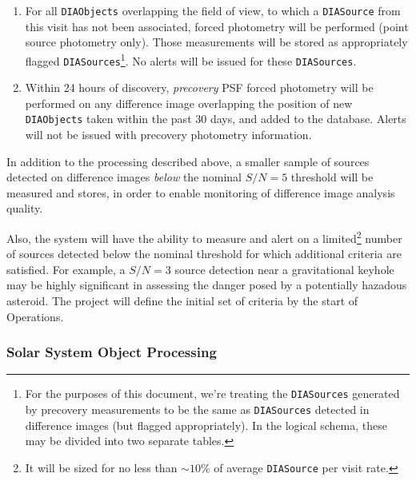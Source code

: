 \documentclass[12pt]{article}
\newcommand{\code}[1]{\texttt{#1}}
\newcommand{\DIASource}{\code{DIASource}\xspace}
\newcommand{\DIASources}{\code{DIASources}\xspace}
\newcommand{\DIAObjects}{\code{DIAObjects}\xspace}
\begin{document}
\begin{enumerate}
\item For all \DIAObjects overlapping the field of view, to which a \DIASource from this visit has not been associated, forced photometry will be performed (point source photometry only). Those measurements will be stored as appropriately flagged \DIASources\footnote{For the purposes of this document, we're treating the \DIASources generated by precovery measurements to be the same as \DIASources detected in difference images (but flagged appropriately). In the logical schema, these may be divided into two separate tables.}.  No alerts will be issued for these \DIASources.
\item Within 24 hours of discovery, {\em precovery} PSF forced photometry will be performed on any difference image overlapping the position of new \DIAObjects taken within the past 30 days, and added to the database. Alerts will not be issued with precovery photometry information.
\end{enumerate}

In addition to the processing described above, a smaller sample of sources detected on difference images {\em below} the nominal $S/N=5$ threshold will be measured and stores, in order to enable monitoring of difference image analysis quality.

Also, the system will have the ability to measure and alert on a limited\footnote{It will be sized for no less than $\sim 10\%$ of average \DIASource per visit rate.} number of sources detected below the nominal threshold for which additional criteria are satisfied. For example, a $S/N = 3$ source detection near a gravitational keyhole may be highly significant in assessing the danger posed by a potentially hazadous asteroid. The project will define the initial set of criteria by the start of Operations.

\subsubsection{Solar System Object Processing}
\label{sec:ssProcessing}
\end{document}
